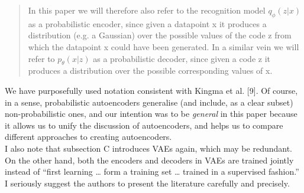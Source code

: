 \documentclass{article}
\begin{document}
    \begin{quote}
       In this paper we will therefore also refer to the recognition model $q_\phi(z|x)$ as a probabilistic encoder, since given a datapoint x it produces a distribution (e.g. a Gaussian) over the possible values of the code z from which the datapoint x could have been generated. In a similar vein we will refer to $p_\theta(x|z)$ as a probabilistic decoder, since given a code z it produces a distribution over the possible corresponding values of x.
    \end{quote}

We have purposefully used notation consistent with Kingma et al. [9]. Of course, in a sense, probabilistic autoencoders generalise (and include, as a clear subset) non-probabilistic ones, and our intention was to be {\em general} in this paper because it allows us to unify the discussion of autoencoders, and helps us to compare different approaches to creating autoencoders. \\

 {\color{blue}I also note that subsection C introduces VAEs again, which may be redundant. On the other hand, both the encoders and decoders in VAEs are trained jointly instead of ``first learning … form a training set … trained in a supervised fashion.'' I seriously suggest the authors to present the literature carefully and precisely.}\\
\end{document}
